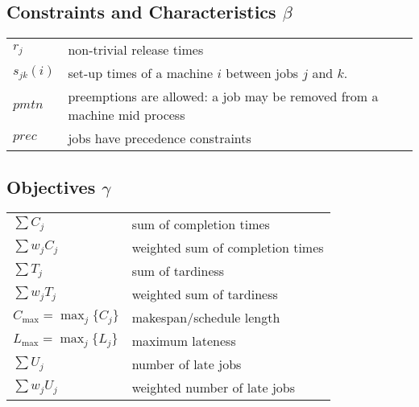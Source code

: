 \documentclass[11pt]{article}
\begin{document}
\subsection*{Constraints and Characteristics $\beta$}

\begin{tabular}{ll}
  $r_j$ & non-trivial release times \\
  $s_{jk}(i)$ & set-up times of a machine $i$ between jobs $j$ and $k$.\\
  $pmtn$ & preemptions are allowed: a job may be removed from a
  machine mid process \\
  $prec$ & jobs have precedence constraints \\
 \end{tabular}

\subsection*{Objectives $\gamma$}

\begin{tabular}{ll}
  $\sum C_j$ & sum of completion times \\
  $\sum w_j C_j$ & weighted sum of completion times \\
  $\sum T_j$ & sum of tardiness \\
  $\sum w_j T_j$ & weighted sum of tardiness \\
  $C_{\max{}} = \max_j\{C_j\}$ & makespan/schedule length \\
  $L_{\max{}} = \max_j\{L_j\}$ & maximum lateness\\
  $\sum U_j$ & number of late jobs \\
  $\sum w_j U_j$ & weighted number of late jobs
\end{tabular}
\end{document}
